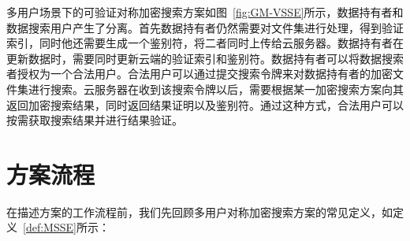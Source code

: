 多用户场景下的可验证对称加密搜索方案\multi 如图~\ref{fig:GM-VSSE}所示，数据持有者和数据搜索用户产生了分离。首先数据持有者仍然需要对文件集进行处理，得到验证索引，同时他还需要生成一个鉴别符，将二者同时上传给云服务器。数据持有者在更新数据时，需要同时更新云端的验证索引和鉴别符。数据持有者可以将数据搜索者授权为一个合法用户。合法用户可以通过提交搜索令牌来对数据持有者的加密文件集进行搜索。云服务器在收到该搜索令牌以后，需要根据某一加密搜索方案向其返回加密搜索结果，同时返回结果证明以及鉴别符。通过这种方式，合法用户可以按需获取搜索结果并进行结果验证。


\section{方案流程}
在描述\multi 方案的工作流程前，我们先回顾多用户对称加密搜索方案的常见定义，如定义~\ref{def:MSSE}所示：

